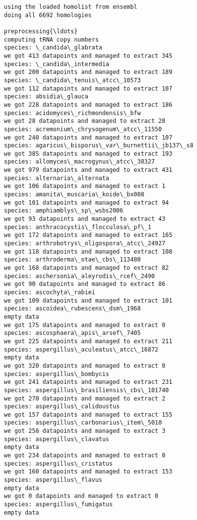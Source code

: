 \documentclass[11pt]{article}
\begin{document}
    \begin{Verbatim}[commandchars=\\\{\}]
using the loaded homolist from ensembl
doing all 6692 homologies
 
preprocessing{\ldots}
computing tRNA copy numbers
species: \_candida\_glabrata
we got 413 datapoints and managed to extract 345
species: \_candida\_intermedia
we got 200 datapoints and managed to extract 189
species: \_candida\_tenuis\_atcc\_10573
we got 112 datapoints and managed to extract 107
species: absidia\_glauca
we got 228 datapoints and managed to extract 186
species: acidomyces\_richmondensis\_bfw
we got 28 datapoints and managed to extract 28
species: acremonium\_chrysogenum\_atcc\_11550
we got 240 datapoints and managed to extract 107
species: agaricus\_bisporus\_var\_burnettii\_jb137\_s8
we got 385 datapoints and managed to extract 193
species: allomyces\_macrogynus\_atcc\_38327
we got 979 datapoints and managed to extract 431
species: alternaria\_alternata
we got 106 datapoints and managed to extract 1
species: amanita\_muscaria\_koide\_bx008
we got 101 datapoints and managed to extract 94
species: amphiamblys\_sp\_wsbs2006
we got 93 datapoints and managed to extract 43
species: anthracocystis\_flocculosa\_pf\_1
we got 172 datapoints and managed to extract 165
species: arthrobotrys\_oligospora\_atcc\_24927
we got 118 datapoints and managed to extract 108
species: arthroderma\_otae\_cbs\_113480
we got 168 datapoints and managed to extract 82
species: aschersonia\_aleyrodis\_rcef\_2490
we got 90 datapoints and managed to extract 86
species: ascochyta\_rabiei
we got 109 datapoints and managed to extract 101
species: ascoidea\_rubescens\_dsm\_1968
empty data
we got 175 datapoints and managed to extract 0
species: ascosphaera\_apis\_arsef\_7405
we got 225 datapoints and managed to extract 211
species: aspergillus\_aculeatus\_atcc\_16872
empty data
we got 320 datapoints and managed to extract 0
species: aspergillus\_bombycis
we got 241 datapoints and managed to extract 231
species: aspergillus\_brasiliensis\_cbs\_101740
we got 270 datapoints and managed to extract 2
species: aspergillus\_calidoustus
we got 157 datapoints and managed to extract 155
species: aspergillus\_carbonarius\_item\_5010
we got 258 datapoints and managed to extract 3
species: aspergillus\_clavatus
empty data
we got 234 datapoints and managed to extract 0
species: aspergillus\_cristatus
we got 160 datapoints and managed to extract 153
species: aspergillus\_flavus
empty data
we got 0 datapoints and managed to extract 0
species: aspergillus\_fumigatus
empty data

\end{Verbatim}
\end{document}
